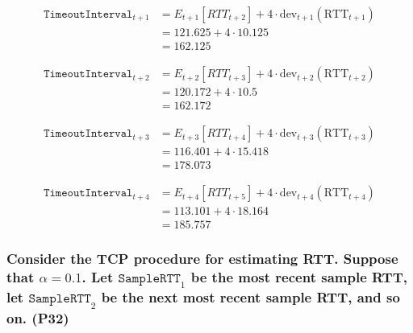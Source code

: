 \begin{equation*}
    \begin{split}
        \texttt{TimeoutInterval}_{t+1} &= E_{t+1}[RTT_{t+2}] + 4 \cdot \text{dev}_{t+1}(\text{RTT}_{t+1}) \\
        &= 121.625 + 4 \cdot 10.125 \\
        &= 162.125
\end{split}
\end{equation*}

\begin{equation*}
    \begin{split}
        \texttt{TimeoutInterval}_{t+2} &= E_{t+2}[RTT_{t+3}] + 4 \cdot \text{dev}_{t+2}(\text{RTT}_{t+2}) \\
        &= 120.172 + 4 \cdot 10.5 \\
        &= 162.172
\end{split}
\end{equation*}

\begin{equation*}
    \begin{split}
        \texttt{TimeoutInterval}_{t+3} &= E_{t+3}[RTT_{t+4}] + 4 \cdot \text{dev}_{t+3}(\text{RTT}_{t+3}) \\
        &= 116.401 + 4 \cdot 15.418 \\
        &= 178.073
\end{split}
\end{equation*}

\begin{equation*}
    \begin{split}
        \texttt{TimeoutInterval}_{t+4} &= E_{t+4}[RTT_{t+5}] + 4 \cdot \text{dev}_{t+4}(\text{RTT}_{t+4}) \\
        &= 113.101 + 4 \cdot 18.164 \\
        &= 185.757
\end{split}
\end{equation*}

\subsubsection{Consider the TCP procedure for estimating RTT. Suppose that $\alpha = 0.1$. Let $\texttt{SampleRTT}_1$ be the most recent sample RTT, let $\texttt{SampleRTT}_2$ be the next most recent sample RTT, and so on. (P32)}

